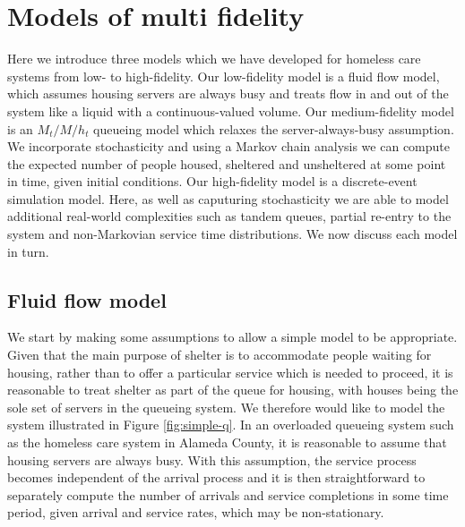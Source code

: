 \documentclass[12pt,a4paper]{article}
\begin{document}
\newpage

\section{Models of multi fidelity} \label{models}
%
Here we introduce three models which we have developed for homeless care systems from low- to high-fidelity. Our low-fidelity model is a fluid flow model, which assumes housing servers are always busy and treats flow in and out of the system like a liquid with a continuous-valued volume. Our medium-fidelity model is an $M_t/M/h_t$ queueing model which relaxes the server-always-busy assumption. We incorporate stochasticity and using a Markov chain analysis we can compute the expected number of people housed, sheltered and unsheltered at some point in time, given initial conditions. Our high-fidelity model is a discrete-event simulation model. Here, as well as caputuring stochasticity we are able to model additional real-world complexities such as tandem queues, partial re-entry to the system and non-Markovian service time distributions. We now discuss each model in turn.
%
\subsection{Fluid flow model} \label{fluid-model}
%
We start by making some assumptions to allow a simple model to be appropriate. Given that the main purpose of shelter is to accommodate people waiting for housing, rather than to offer a particular service which is needed to proceed, it is reasonable to treat shelter as part of the queue for housing, with houses being the sole set of servers in the queueing system. We therefore would like to model the system illustrated in Figure \ref{fig:simple-q}. In an overloaded queueing system such as the homeless care system in Alameda County, it is reasonable to assume that housing servers are always busy. With this assumption, the service process becomes independent of the arrival process and it is then straightforward to separately compute the number of arrivals and service completions in some time period, given arrival and service rates, which may be non-stationary.
\end{document}
